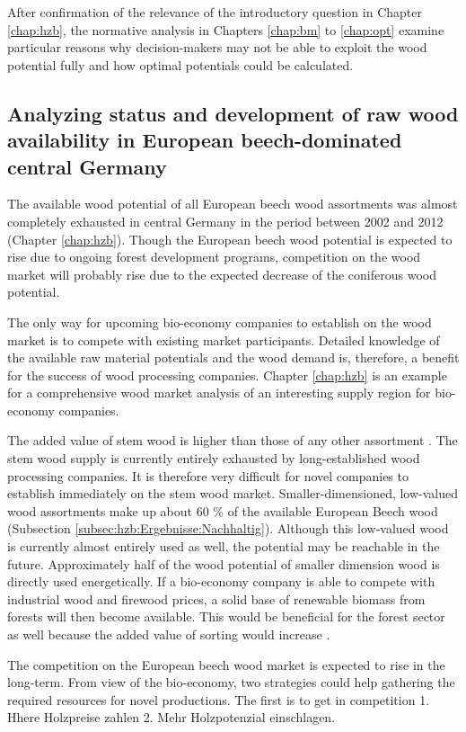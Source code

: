 After confirmation of the relevance of the introductory question in Chapter \ref{chap:hzb}, the normative analysis in Chapters \ref{chap:bm} to \ref{chap:opt} examine particular reasons why decision-makers may not be able to exploit the wood potential fully and how optimal potentials could be calculated.

\subsection{Analyzing status and development of raw wood availability in European beech-dominated central Germany}
\label{subsec:discussion:struct:hzb}
The available wood potential of all European beech wood assortments was almost completely exhausted in central Germany in the period between 2002 and 2012 (Chapter \ref{chap:hzb}). Though the European beech wood potential is expected to rise due to ongoing forest development programs, competition on the wood market will probably rise due to the expected decrease of the coniferous wood potential.

The only way for upcoming bio-economy companies to establish on the wood market is to compete with existing market participants. Detailed knowledge of the available raw material potentials and the wood demand is, therefore, a benefit for the success of wood processing companies. Chapter \ref{chap:hzb} is an example for a comprehensive wood market analysis of an interesting supply region for bio-economy companies.

The added value of stem wood is higher than those of any other assortment \citep{nagel_2008}. The stem wood supply is currently entirely exhausted by long-established wood processing companies. It is therefore very difficult for novel companies to establish immediately on the stem wood market. Smaller-dimensioned, low-valued wood assortments make up about 60 \% of the available European Beech wood (Subsection \ref{subsec:hzb:Ergebnisse:Nachhaltig}). Although this low-valued wood is currently almost entirely used as well, the potential may be reachable in the future. Approximately half of the wood potential of smaller dimension wood is directly used energetically. If a bio-economy company is able to compete with industrial wood and firewood prices, a solid base of renewable biomass from forests will then become available. This would be beneficial for the forest sector as well because the added value of sorting would increase \cite[p. 67]{mohring_1997}.

The competition on the European beech wood market is expected to rise in the long-term. From view of the bio-economy, two strategies could help gathering the required resources for novel productions. The first is to get in competition 
1. Hhere Holzpreise zahlen
2. Mehr Holzpotenzial einschlagen.

